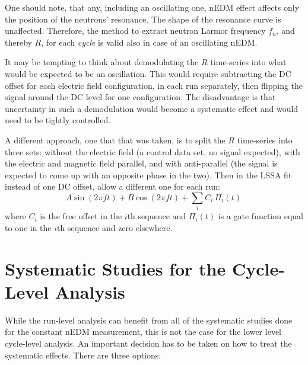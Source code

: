 One should note, that any, including an oscillating one, nEDM effect affects only the position of the neutrons' resonance. The shape of the resonance curve is unaffected. Therefore, the method to extract neutron Larmor frequency $f_n$, and thereby $R$, for each \emph{cycle} is valid also in case of an oscillating nEDM.

It may be tempting to think about demodulating the $R$ time-series into what would be expected to be an oscillation. This would require subtracting the DC offset for each electric field configuration, in each run separately, then flipping the signal around the DC level for one configuration.  The disadvantage is that uncertainty in such a demodulation would become a systematic effect and would need to be tightly controlled.

A different approach, one that that was taken, is to split the $R$ time-series into three sets: without the electric field (a control data set, no signal expected), with the electric and magnetic field parallel, and with anti-parallel (the signal is expected to come up with an opposite phase in the two). Then in the LSSA fit instead of one DC offset, allow a different one for each run:
\begin{equation}
  \label{eq:axions_LSSA}
  A\sin(2 \pi f t) + B\cos(2 \pi f t) + \sum_i C_i\,\Pi_i(t) \,
\end{equation}
where $C_i$ is the free offset in the $i$th sequence and $\Pi_i(t)$ is a gate function equal to one in the $i$th sequence and zero elsewhere.






\section{Systematic Studies for the Cycle-Level Analysis}
While the run-level analysis can benefit from all of the systematic studies done for the constant nEDM measurement, this is not the case for the lower level cycle-level analysis. An important decision has to be taken on how to treat the systematic effects. There are three options:


